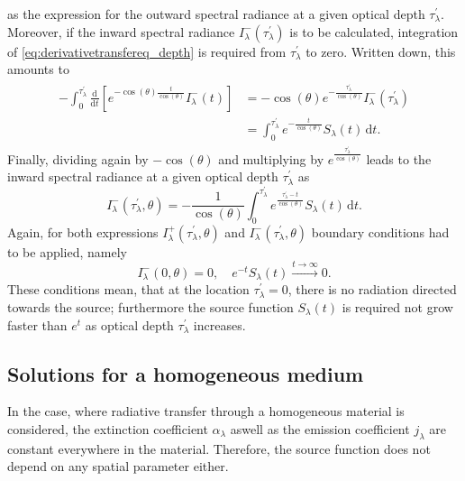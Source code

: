 \documentclass[a4paper,11pt]{report}
\begin{document}
as the expression for the outward spectral radiance at a given optical depth $\tau_\lambda^\prime$. Moreover, if the inward spectral radiance $I^-_\lambda(\tau_\lambda^\prime)$ is to be calculated, integration of \cref{eq:derivativetransfereq_depth} is required from $\tau_\lambda^\prime$ to zero. Written down, this amounts to \begin{align}\begin{aligned}
-\int_{0}^{\tau_\lambda^\prime}\frac{\mathrm{d}}{\mathrm{d}t}\left[e^{-\cos(\theta)\frac{t}{\cos(\theta)}}I_\lambda^-(t)\right] &= -\cos(\theta)e^{-\frac{\tau_\lambda^\prime}{\cos(\theta)}}I_\lambda^-(\tau_\lambda^\prime) \\ &= \int_{0}^{\tau_\lambda^\prime}e^{-\frac{t}{\cos(\theta)}}S_\lambda(t)\,\mathrm{d}t.
\end{aligned}\end{align} Finally, dividing again by $-\cos(\theta)$ and multiplying by $e^{\frac{\tau_\lambda^\prime}{\cos(\theta)}}$ leads to the inward spectral radiance at a given optical depth $\tau_\lambda^\prime$ as \begin{equation}\label{eq:formaltransferequationinward_depth}
I_\lambda^-(\tau_\lambda^\prime,\theta) = -\frac{1}{\cos(\theta)}\int_{0}^{\tau_\lambda^\prime}e^{\frac{\tau_\lambda^\prime-t}{\cos(\theta)}}S_\lambda(t)\,\mathrm{d}t.
\end{equation} Again, for both expressions $I_\lambda^+(\tau_\lambda^\prime,\theta)$ and $I_\lambda^-(\tau_\lambda^\prime,\theta)$ boundary conditions had to be applied, namely \begin{equation}
I_\lambda^-(0,\theta) = 0, \quad e^{-t}S_\lambda(t) \xrightarrow{t\rightarrow \infty} 0.
\end{equation} These conditions mean, that at the location $\tau_\lambda^\prime = 0$, there is no radiation directed towards the source; furthermore the source function $S_\lambda(t)$ is required not grow faster than $e^{t}$ as optical depth $\tau^\prime_\lambda$ increases.

\subsection{Solutions for a homogeneous medium}
In the case, where radiative transfer through a homogeneous material is considered, the extinction coefficient $\alpha_\lambda$ aswell as the emission coefficient $j_\lambda$ are constant everywhere in the material. Therefore, the source function does not depend on any spatial parameter either.
\end{document}
